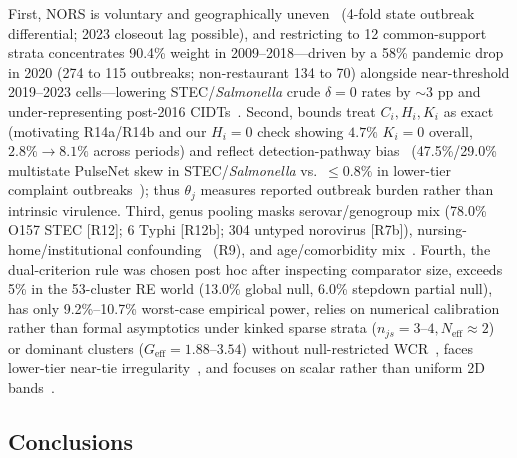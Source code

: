 First, NORS is voluntary and geographically uneven~\cite{white2022foodborne} (4-fold state outbreak differential; 2023 closeout lag possible), and restricting to 12 common-support strata concentrates 90.4\% weight in 2009--2018---driven by a 58\% pandemic drop in 2020 (274 to 115 outbreaks; non-restaurant 134 to 70) alongside near-threshold 2019--2023 cells---lowering STEC/\textit{Salmonella} crude $\delta=0$ rates by $\sim 3\text{ pp}$ and under-representing post-2016 CIDTs~\cite{tack2021shiga,scallanwalter2025foodborne,ray2021decreased}. Second, bounds treat $C_i, H_i, K_i$ as exact (motivating R14a/R14b and our $H_i=0$ check showing $4.7\%$ $K_i=0$ overall, $2.8\% \to 8.1\%$ across periods) and reflect detection-pathway bias~\cite{heiman2015escherichia,lipsitch2015potential} (47.5\%/29.0\% multistate PulseNet skew in STEC/\textit{Salmonella} vs.\ $\le 0.8\%$ in lower-tier complaint outbreaks~\cite{li2010evaluation,hedberg2024estimating}); thus $\theta_j$ measures reported outbreak burden rather than intrinsic virulence. Third, genus pooling masks serovar/genogroup mix (78.0\% O157 STEC [R12]; 6 Typhi [R12b]; 304 untyped norovirus [R7b]), nursing-home/institutional confounding~\cite{burke2019norovirus} (R9), and age/comorbidity mix~\cite{jones2008salmonellosis,gould2013increased,geissler2017increasing}. Fourth, the dual-criterion rule was chosen post hoc after inspecting comparator size, exceeds 5\% in the 53-cluster RE world (13.0\% global null, 6.0\% stepdown partial null), has only 9.2\%--10.7\% worst-case empirical power, relies on numerical calibration rather than formal asymptotics under kinked sparse strata ($n_{js}=3$--$4, N_{\text{eff}} \approx 2$)~\cite{fang2019inference} or dominant clusters ($G_{\text{eff}}=1.88$--$3.54$) without null-restricted WCR~\cite{mackinnon2023cluster}, faces lower-tier near-tie irregularity~\cite{hall2009using,xie2009confidence}, and focuses on scalar rather than uniform 2D bands~\cite{masten2020inference}.

\subsection{Conclusions}\label{sec:conclusions}

